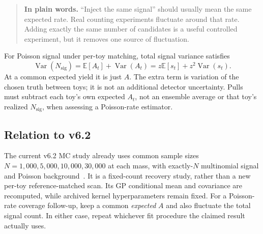 \documentclass[11pt]{article}
\newcommand{\E}{\mathbb E}
\newcommand{\Var}{\operatorname{Var}}
\newcommand{\plain}[1]{\begin{quote}\textbf{In plain words.} #1\end{quote}}
\begin{document}
\plain{``Inject the same signal'' should usually mean the same expected
rate. Real counting experiments fluctuate around that rate. Adding exactly
the same number of candidates is a useful controlled experiment, but it
removes one source of fluctuation.}

For Poisson signal under per-toy matching, total signal variance satisfies
\begin{equation}
 \Var(N_{\mathrm{sig}})=\E[A_t]+\Var(A_t)
 =z\E[s_t]+z^2\Var(s_t).
\end{equation}
At a common expected yield it is just $A$. The extra term is variation of
the chosen truth between toys; it is not an additional detector uncertainty.
Pulls must subtract each toy's own expected $A_t$, not an ensemble average
or that toy's realized $N_{\mathrm{sig}}$, when assessing a Poisson-rate
estimator.

\subsection*{Relation to v6.2}
The current v6.2 MC study already uses common sample sizes
$N=1{,}000,5{,}000,10{,}000,30{,}000$ at each mass, with exactly-$N$
multinomial signal and Poisson background~\cite{mcstudy}. It is a fixed-count
recovery study, rather than a new per-toy reference-matched scan. Its GP
conditional mean and covariance are recomputed, while archived kernel
hyperparameters remain fixed. For a Poisson-rate coverage follow-up, keep a
common \emph{expected} $A$ and also fluctuate the total signal count. In
either case, repeat whichever fit procedure the claimed result actually uses.

\clearpage
\end{document}
